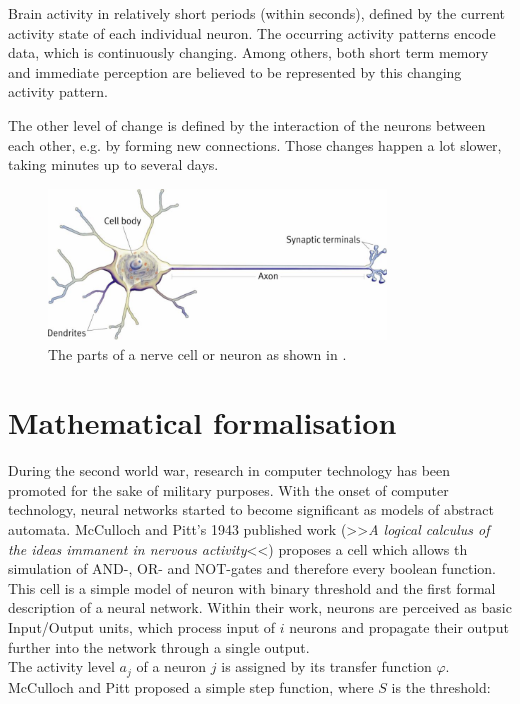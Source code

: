 \documentclass[10pt,a4paper,DIV=11]{scrreprt}
\begin{document}
Brain activity in relatively short periods (within seconds), defined by the current activity state of each individual neuron. The occurring 
activity patterns encode data, which is continuously changing. Among others, both short term memory and immediate perception are believed to be 
represented by this changing activity pattern.

The other level of change is defined by the interaction of the neurons between each other, e.g. by forming new connections. Those changes happen 
a lot slower, taking minutes up to several days.\cite{NEUINF} 

\begin{center}
\begin{figure}
\includegraphics[width=0.8\textwidth,scale=1]{files/neuron.jpg}  
\caption{The parts of a nerve cell or neuron as shown in \cite{NEU}.}
\label{fig:neuron}
\end{figure}
\end{center}


\section{Mathematical formalisation}\label{sec:mcpitts}
During the second world war, research in computer technology has been promoted for the sake of military purposes. With the onset of computer 
technology, neural networks started to become significant as models of abstract automata. McCulloch and Pitt's 1943 published work 
(>>\textit{A logical calculus of the ideas immanent in nervous activity}<<) proposes a cell which allows th simulation of AND-, OR- and NOT-gates 
and therefore every boolean function. This cell is a simple model of neuron with binary threshold and the first formal description of a 
neural network. Within their work, neurons are perceived as basic Input/Output units, which process input of $i$ neurons and propagate their 
output further into the network through a single output.\\

The activity level $a_j$ of a neuron $j$ is assigned by its transfer function $\varphi$. McCulloch and Pitt proposed a simple step function, 
where $S$ is the threshold:\\
\end{document}
